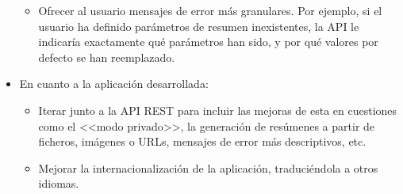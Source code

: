 \begin{itemize}[\textbullet]
\begin{itemize}[◦]
		\item Ofrecer al usuario mensajes de error más granulares. Por ejemplo, si el usuario ha definido parámetros de resumen inexistentes, la API le indicaría exactamente qué parámetros han sido, y por qué valores por defecto se han reemplazado.
	\end{itemize}
	\item En cuanto a la aplicación desarrollada:
	\begin{itemize}[◦]
		\item Iterar junto a la API REST para incluir las mejoras de esta en cuestiones como el <<modo privado>>, la generación de resúmenes a partir de ficheros, imágenes o URLs, mensajes de error más descriptivos, etc.
		
		\item Mejorar la internacionalización de la aplicación, traduciéndola a otros idiomas.
	\end{itemize}
\end{itemize}